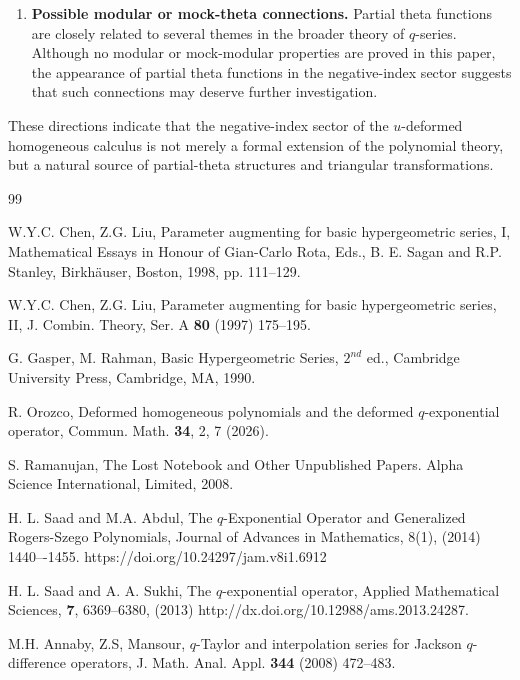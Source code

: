 \documentclass[12pt]{article}
\begin{document}
\begin{enumerate}
\item \textbf{Possible modular or mock-theta connections.} Partial theta functions are closely related to several themes in the broader theory of \(q\)-series. Although no modular or mock-modular properties are proved in this paper, the appearance of partial theta functions in the negative-index sector suggests that such connections may deserve further investigation. 
\end{enumerate} 
These directions indicate that the negative-index sector of the \(u\)-deformed homogeneous calculus is not merely a formal extension of the polynomial theory, but a natural source of partial-theta structures and triangular transformations.

\begin{thebibliography}{99}

W.Y.C. Chen, Z.G. Liu,
Parameter augmenting for basic hypergeometric series, I,
Mathematical Essays in Honour of Gian-Carlo Rota, Eds., B. E. Sagan and R.P. Stanley, Birkh\"auser, Boston, 1998, pp. 111--129.

W.Y.C. Chen, Z.G. Liu,
Parameter augmenting for basic hypergeometric series, II,
J. Combin. Theory, Ser. A
\textbf{80} (1997) 175--195.

G. Gasper, M. Rahman,
Basic Hypergeometric Series, $2^{nd}$ ed., 
Cambridge University Press, Cambridge, MA, 1990.

R. Orozco, 
Deformed homogeneous polynomials and the deformed $q$-exponential operator, 
Commun. Math. \textbf{34}, 2, 7
(2026).

S. Ramanujan, 
The Lost Notebook and Other Unpublished Papers. 
Alpha Science International, Limited, 2008.

H. L. Saad and M.A. Abdul, 
The $q$-Exponential Operator and Generalized Rogers-Szego Polynomials, 
Journal of Advances in Mathematics, 8(1), (2014) 1440–-1455. 
https://doi.org/10.24297/jam.v8i1.6912

H. L. Saad and A. A. Sukhi, 
The $q$-exponential operator, 
Applied Mathematical Sciences, \textbf{7}, 6369--6380, (2013)
http://dx.doi.org/10.12988/ams.2013.24287.

M.H. Annaby, Z.S, Mansour,
$q$-Taylor and interpolation series for Jackson $q$-difference operators,
J. Math. Anal. Appl. \textbf{344} (2008) 472--483.


\end{thebibliography}
\end{document}
